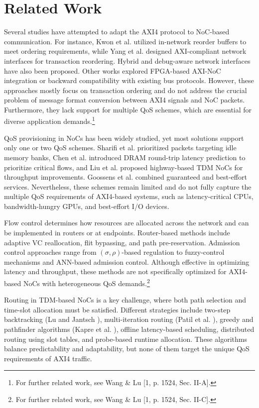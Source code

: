 \section{Related Work}

Several studies have attempted to adapt the AXI4 protocol to NoC-based communication. For instance, Kwon et al.\cite{yang_nisar_2007} utilized in-network reorder buffers to meet ordering requirements, while Yang et al.\cite{kwon_-network_2009} designed AXI-compliant network interfaces for transaction reordering. Hybrid and debug-aware network interfaces have also been proposed. 
Other works explored FPGA-based AXI-NoC integration or backward compatibility with existing bus protocols. However, these approaches mostly focus on transaction ordering and do not address the crucial problem of message format conversion between AXI4 signals and NoC packets. Furthermore, they lack support for multiple QoS schemes, which are essential for diverse application demands.\footnote{For further related work, see Wang \& Lu [1, p. 1524, Sec. II-A].} 


QoS provisioning in NoCs has been widely studied, yet most solutions support only one or two QoS schemes. Sharifi et al.\cite{sharifi_addressing_2012} prioritized packets targeting idle memory banks, Chen et al.\cite{chen_round-trip_2017} introduced DRAM round-trip latency prediction to prioritize critical flows, and Liu et al.\cite{liu_highway_2015} proposed highway-based TDM NoCs for throughput improvements. Goossens et al.\cite{goossens_aethereal_2005} combined guaranteed and best-effort services. Nevertheless, these schemes remain limited and do not fully capture the multiple QoS requirements of AXI4-based systems, such as latency-critical CPUs, bandwidth-hungry GPUs, and best-effort I/O devices. 


Flow control determines how resources are allocated across the network and can be implemented in routers or at endpoints. Router-based methods include adaptive \ac{VC} reallocation, flit bypassing, and path pre-reservation. Admission control approaches range from $(\sigma,\rho)$-based regulation to fuzzy-control mechanisms and ANN-based admission control. Although effective in optimizing latency and throughput, these methods are not specifically optimized for AXI4-based NoCs with heterogeneous QoS demands.\footnote{For further related work, see Wang \& Lu [1, p. 1524, Sec. II-C].}  


Routing in TDM-based NoCs is a key challenge, where both path selection and time-slot allocation must be satisfied. Different strategies include two-step backtracking (Lu and Jantsch \cite{lu_tdm_2008}), multi-iteration routing (Patil et al. \cite{patil_bandwidth-optimized_2018}), greedy and pathfinder algorithms (Kapre et al. \cite{kapre_packet_2006}), offline latency-based scheduling, distributed routing using slot tables, and probe-based runtime allocation. These algorithms balance predictability and adaptability, but none of them target the unique QoS requirements of AXI4 traffic. 



